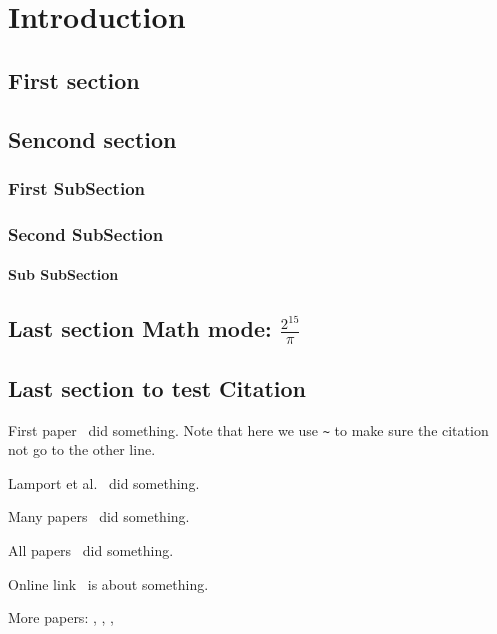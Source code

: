 \chapter{Introduction}
\lipsum[2]

\section{First section}
\lipsum[3]

\section{Sencond  section}
\lipsum[3]
\subsection{First SubSection}
\lipsum[3]
\subsection{Second SubSection}
\lipsum[3]
\subsubsection{Sub SubSection}
\lipsum[3]	 
	 
\section{Last section Math mode: $\frac{2^{15}}{\pi}$} 
\lipsum[3]
\section{Last section to test Citation} 

First paper~\cite{goossens1994latex} did something. Note that here we use \verb|~| to make sure the citation not go to the other line. 

Lamport et al.~\cite{lamport1994latex} did something.

Many papers~\cite{makuuchi2000progress,yassin1994latex} did something.


All papers~\cite{makuuchi2000progress,yassin1994latex,
	goossens1994latex,lamport1994latex} did something.

Online link~\cite{onlineWindows} is about something.

More papers: \cite{colu92}, \cite{goossens1994latex}, \cite{jame76}, \cite{colu92,phil99,gree00,smit54}
